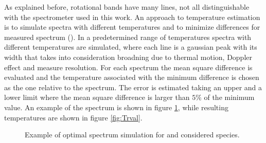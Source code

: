 As explained before, rotational bands have many lines, not all distinguishable with the spectrometer used in this work. An approach to temperature estimation is to simulate spectra with different temperatures and to minimize differences for measured spectrum (\cite{Izarra_2000}).
In a predetermined range of temperatures spectra with different temperatures are simulated, where each line is a gaussian peak with its width that takes into consideration broadning due to thermal motion, Doppler effect and measure resolution. For each spectrum the mean square difference is evaluated and the temperature associated with the minimum difference is chosen as the one relative to the spectrum. The error is estimated taking an upper and a lower limit where the mean square difference is larger than $5\%$ of the minimum value. An example of the spectrum is shown in figure \ref{fig:Trfit}, while resulting temperatures are shown in figure \ref{fig:Trval}.
\begin{figure}
\centering
  \hfill
 \caption{Example of optimal spectrum simulation for  and  considered species.}
 \label{fig:Trfit}
\end{figure}


